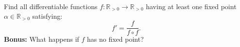 \begin{problem}
    Find all differentiable functions \( f : \mathbb{R}_{>0} \to \mathbb{R}_{>0} \) having at least one fixed point \( \alpha\in\mathbb{R}_{>0} \) satisfying:
    \[
        f' = \frac{f}{f \circ f}.
    \]
    \textbf{Bonus:} What happens if \( f \) has no fixed point?
\end{problem}
